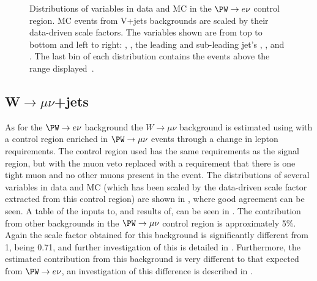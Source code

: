 \begin{figure}
  \caption[Distributions of variables in data and \ac{MC} in the $\PW\rightarrow e\nu$ control region. \ac{MC} events from V+jets backgrounds are scaled by their data-driven scale factors. The variables shown are from top to bottom and left to right: \detajj, \Mjj, the leading and sub-leading jet's \pt, \METnoMU, \METsig and \jetmetdphi. The last bin of each distribution contains the events above the range displayed.]{Distributions of variables in data and \ac{MC} in the $\PW\rightarrow e\nu$ control region. \ac{MC} events from V+jets backgrounds are scaled by their data-driven scale factors. The variables shown are from top to bottom and left to right: \detajj, \Mjj, the leading and sub-leading jet's \pt, \METnoMU, \METsig and \jetmetdphi. The last bin of each distribution contains the events above the range displayed~\cite{CMS-PAS-HIG-14-038}.}
  \label{fig:parkedwenu}
\end{figure}

\subsection{W$\rightarrow \mu\nu$+jets}
\label{sec:parkedwmunu}
As for the $\PW\rightarrow e\nu$ background the $W\rightarrow \mu\nu$ background is estimated using  with a control region enriched in $\PW\rightarrow\mu\nu$ events through a change in lepton requirements. The control region used has the same requirements as the signal region, but with the muon veto replaced with a requirement that there is one tight muon and no other muons present in the event. The distributions of several variables in data and \ac{MC} (which has been scaled by the data-driven scale factor extracted from this control region) are shown in , where good agreement can be seen. A table of the inputs to, and results of,  can be seen in . The contribution from other backgrounds in the $\PW\rightarrow\mu\nu$ control region is approximately 5\%. Again the scale factor obtained  for this background is significantly different from 1, being 0.71, and further investigation of this is detailed in . Furthermore, the estimated contribution from this background is very different to that expected from $\PW\rightarrow e\nu$, an investigation of this difference is described in .

